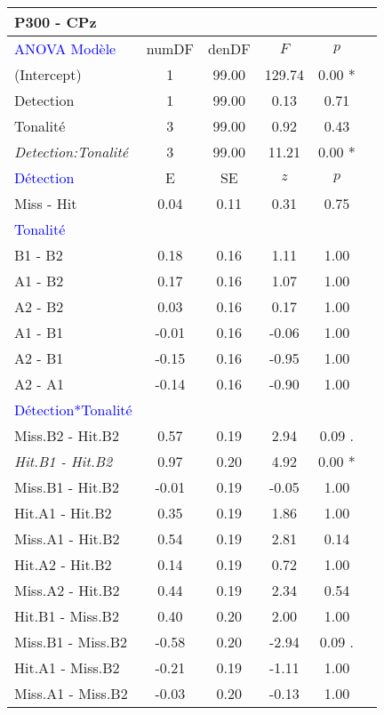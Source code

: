 \begin{landscape}
\begin{table}
\begin{multicols}{4}
\begin{tabular}{|l|*{5}{c|}}
\hline
\textbf{P300 - CPz} & & & & \\
\hline
\textcolor{blue}{ANOVA Modèle} & numDF & denDF & $F$ & $p$ \\ 
\hline
(Intercept) & 1 & 99.00 & 129.74 & 0.00 * \\ 
Detection & 1 & 99.00 & 0.13 & 0.71 \\ 
Tonalité & 3 & 99.00 & 0.92 & 0.43 \\ 
\textit{Detection:Tonalité} & 3 & 99.00 & 11.21 & 0.00 * \\ 
\hline
\textcolor{blue}{Détection} & E & SE & $z$ & $p$ \\ 
\hline
Miss - Hit & 0.04 & 0.11 & 0.31 & 0.75 \\ 
\hline
\textcolor{blue}{Tonalité} & & & & \\ 
\hline
B1 - B2 & 0.18 & 0.16 & 1.11 & 1.00 \\ 
A1 - B2 & 0.17 & 0.16 & 1.07 & 1.00 \\ 
A2 - B2 & 0.03 & 0.16 & 0.17 & 1.00 \\ 
A1 - B1 & -0.01 & 0.16 & -0.06 & 1.00 \\ 
A2 - B1 & -0.15 & 0.16 & -0.95 & 1.00 \\ 
A2 - A1 & -0.14 & 0.16 & -0.90 & 1.00 \\ 
\hline
\textcolor{blue}{Détection*Tonalité} & & & & \\ 
\hline
Miss.B2 - Hit.B2 & 0.57 & 0.19 & 2.94 & 0.09 . \\ 
\textit{Hit.B1 - Hit.B2} & 0.97 & 0.20 & 4.92 & 0.00 * \\ 
Miss.B1 - Hit.B2 & -0.01 & 0.19 & -0.05 & 1.00 \\ 
Hit.A1 - Hit.B2 & 0.35 & 0.19 & 1.86 & 1.00 \\ 
Miss.A1 - Hit.B2 & 0.54 & 0.19 & 2.81 & 0.14 \\ 
Hit.A2 - Hit.B2 & 0.14 & 0.19 & 0.72 & 1.00 \\ 
Miss.A2 - Hit.B2 & 0.44 & 0.19 & 2.34 & 0.54 \\ 
Hit.B1 - Miss.B2 & 0.40 & 0.20 & 2.00 & 1.00 \\ 
Miss.B1 - Miss.B2 & -0.58 & 0.20 & -2.94 & 0.09 . \\ 
Hit.A1 - Miss.B2 & -0.21 & 0.19 & -1.11 & 1.00 \\ 
Miss.A1 - Miss.B2 & -0.03 & 0.20 & -0.13 & 1.00 \\ 

\end{tabular}
\end{multicols}
\end{table}
\end{landscape}

